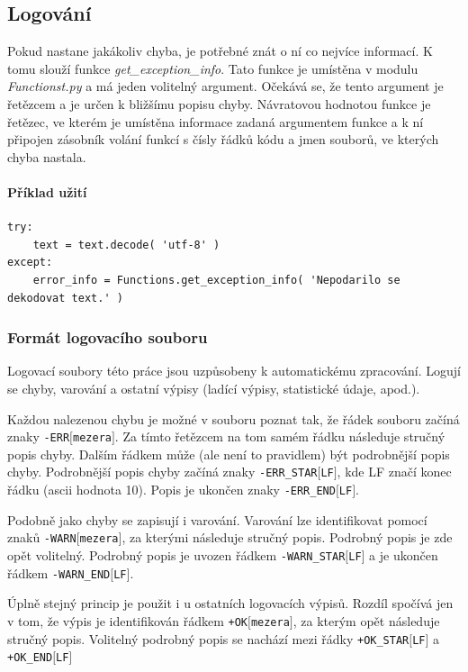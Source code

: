 \subsection{Logování}
Pokud nastane jakákoliv chyba, je potřebné znát o ní co nejvíce informací. K tomu
slouží funkce \textit{get\_exception\_info}. Tato funkce je umístěna v modulu \textit{Functionst.py}
a má jeden volitelný argument. Očekává se, že tento argument je řetězcem a je určen k bližšímu
popisu chyby. Návratovou hodnotou funkce je řetězec, ve kterém je umístěna informace zadaná
argumentem funkce a k ní připojen zásobník volání funkcí s čísly řádků kódu a jmen souborů,
ve kterých chyba nastala.

\paragraph{Příklad užití}
\begin{lstlisting}
try:
    text = text.decode( 'utf-8' )
except:
    error_info = Functions.get_exception_info( 'Nepodarilo se dekodovat text.' )
\end{lstlisting}

\subsubsection{Formát logovacího souboru}
Logovací soubory této práce jsou uzpůsobeny k automatickému zpracování. Logují se
chyby, varování a ostatní výpisy (ladící výpisy, statistické údaje, apod.).

Každou nalezenou chybu je možné v souboru poznat tak, že řádek souboru
začíná znaky \texttt{-ERR$[$mezera$]$}. Za tímto řetězcem na tom samém řádku následuje
stručný popis chyby. Dalším řádkem může (ale není to pravidlem) být podrobnější popis chyby.
Podrobnější popis chyby začíná znaky \texttt{-ERR\_STAR$[$LF$]$}, kde LF značí konec řádku (ascii hodnota 10).
Popis je ukončen znaky \texttt{-ERR\_END$[$LF$]$}.

Podobně jako chyby se zapisují i varování. Varování lze identifikovat pomocí znaků \texttt{-WARN$[$mezera$]$},
za kterými následuje stručný popis. Podrobný popis je zde opět volitelný. Podrobný popis je uvozen řádkem
\texttt{-WARN\_STAR$[$LF$]$} a je ukončen řádkem \texttt{-WARN\_END$[$LF$]$}.

Úplně stejný princip je použit i u ostatních logovacích výpisů. Rozdíl spočívá jen v tom, že
výpis je identifikován řádkem \texttt{+OK$[$mezera$]$}, za kterým opět následuje stručný popis.
Volitelný podrobný popis se nachází mezi řádky \texttt{+OK\_STAR$[$LF$]$} a \texttt{+OK\_END$[$LF$]$}

